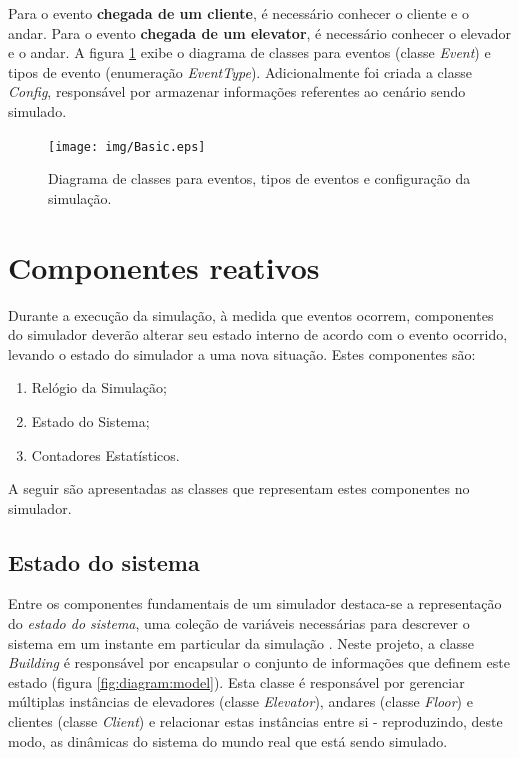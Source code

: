 Para o evento \textbf{chegada de um cliente}, é necessário conhecer o cliente e
o andar. Para o evento \textbf{chegada de um elevator}, é necessário conhecer o
elevador e o andar. A figura \ref{fig:diagram:event} exibe o diagrama de classes
para eventos (classe \textit{Event}) e tipos de evento (enumeração
\textit{EventType}). Adicionalmente foi criada a classe \textit{Config},
responsável por armazenar informações referentes ao cenário sendo simulado.

\begin{figure}[htb!]
  \centering
  \texttt{[image: img/Basic.eps]}
  \caption[Diagrama de classes para eventos, tipos e configuração]{Diagrama de classes para eventos, tipos de eventos e configuração da simulação.}
\label{fig:diagram:event}
\end{figure}

\section{\label{sec:reactive}Componentes reativos}

Durante a execução da simulação, à medida que eventos ocorrem, componentes do
simulador deverão alterar seu estado interno de acordo com o evento ocorrido,
levando o estado do simulador a uma nova situação. Estes componentes são:

\begin{enumerate}
  \item Relógio da Simulação;
  \item Estado do Sistema;
  \item Contadores Estatísticos.
\end{enumerate}

A seguir são apresentadas as classes que representam estes componentes no
simulador.

\subsection{Estado do sistema}

Entre os componentes fundamentais de um simulador destaca-se a representação do
\textit{estado do sistema}, uma coleção de variáveis necessárias para descrever
o sistema em um instante em particular da simulação \cite{Law}. Neste projeto, a
classe \textit{Building} é responsável por encapsular o conjunto de informações
que definem este estado (figura \ref{fig:diagram:model}). Esta classe é
responsável por gerenciar múltiplas instâncias de elevadores (classe
\textit{Elevator}), andares (classe \textit{Floor}) e clientes (classe
\textit{Client}) e relacionar estas instâncias entre si - reproduzindo, deste
modo, as dinâmicas do sistema do mundo real que está sendo simulado.

